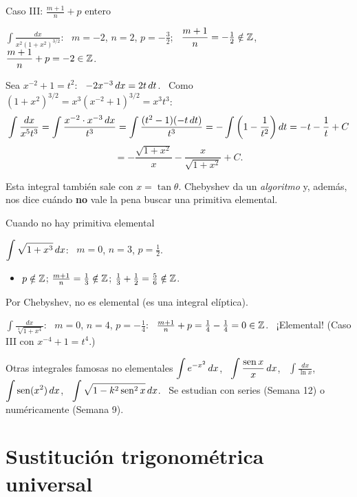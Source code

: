 \documentclass[10pt,aspectratio=169]{beamer}
\begin{document}
\begin{frame}{Caso III: $\frac{m+1}{n}+p$ entero}
  \begin{ejemplo}[5]
    $\displaystyle\int\frac{dx}{x^2\left(1+x^2\right)^{3/2}}$: \ $m=-2$, $n=2$, $p=-\tfrac32$; \
    $\dfrac{m+1}{n}=-\tfrac12\notin\mathbb{Z}$, \ $\dfrac{m+1}{n}+p=-2\in\mathbb{Z}$.

    Sea $x^{-2}+1=t^2$: \ $-2x^{-3}\,dx=2t\,dt$. \ Como $(1+x^2)^{3/2}=x^3(x^{-2}+1)^{3/2}=x^3t^3$:
    \[ \int\frac{dx}{x^5t^3}=\int\frac{x^{-2}\cdot x^{-3}\,dx}{t^3}=\int\frac{(t^2-1)(-t\,dt)}{t^3}=-\int\left(1-\frac1{t^2}\right)dt=-t-\frac1t+C \]
    \[ =-\frac{\sqrt{1+x^2}}{x}-\frac{x}{\sqrt{1+x^2}}+C. \]
  \end{ejemplo}
  \begin{observacion}
    Esta integral también sale con $x=\tan\theta$. Chebyshev da un \emph{algoritmo} y, además, nos dice cuándo
    \textbf{no} vale la pena buscar una primitiva elemental.
  \end{observacion}
\end{frame}

\begin{frame}{Cuando no hay primitiva elemental}
  \begin{ejemplo}[6]
    $\displaystyle\int\sqrt{1+x^3}\,dx$: \ $m=0$, $n=3$, $p=\tfrac12$.
    \begin{itemize}
      \item $p\notin\mathbb{Z}$; \quad $\frac{m+1}{n}=\frac13\notin\mathbb{Z}$; \quad $\frac13+\frac12=\frac56\notin\mathbb{Z}$.
    \end{itemize}
    Por Chebyshev, \alert{no es elemental} (es una integral elíptica).
  \end{ejemplo}
  \begin{ejemplo}[7]
    $\displaystyle\int\frac{dx}{\sqrt[4]{1+x^4}}$: \ $m=0$, $n=4$, $p=-\frac14$: \ $\frac{m+1}{n}+p=\frac14-\frac14=0\in\mathbb{Z}$. \ ¡Elemental!
    (Caso III con $x^{-4}+1=t^4$.)
  \end{ejemplo}
  \begin{block}{Otras integrales famosas no elementales}
    $\displaystyle\int e^{-x^2}\,dx$, \ $\displaystyle\int\frac{\operatorname{sen} x}{x}\,dx$, \ $\displaystyle\int\frac{dx}{\ln x}$,
    \ $\displaystyle\int\operatorname{sen}(x^2)\,dx$, \ $\displaystyle\int\sqrt{1-k^2\operatorname{sen}^2x}\,dx$. \
    Se estudian con series (Semana 12) o numéricamente (Semana 9).
  \end{block}
\end{frame}

\section{Sustitución trigonométrica universal}
\end{document}
